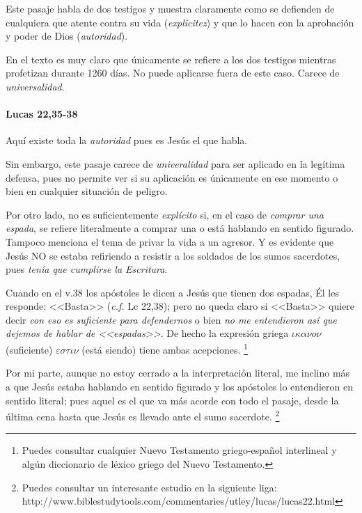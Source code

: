 \documentclass{article}
\begin{document}
Este pasaje habla de dos testigos y muestra claramente como se defienden de cualquiera que atente contra su vida (\emph{explicitez}) y que lo hacen con la aprobaci\'on y poder de Dios (\emph{autoridad}).

En el texto es muy claro que \'unicamente se refiere a los dos testigos mientras profetizan durante 1260 d\'{i}as. No puede aplicarse fuera de este caso. Carece de \emph{universalidad}.

\paragraph{Lucas 22,35-38}

Aqu\'{i} existe toda la \emph{autoridad} pues es Jes\'us el que habla.

Sin embargo, este pasaje carece de \emph{univeralidad} para ser aplicado en la leg\'{i}tima defensa, pues no permite ver si su aplicaci\'on es \'unicamente en ese momento o bien en cualquier situaci\'on de peligro.

Por otro lado, no es suficientemente \emph{expl\'{i}cito} si, en el caso de \emph{comprar una espada}, se refiere literalmente a comprar una o est\'a hablando en sentido figurado. Tampoco menciona el tema de privar la vida a un agresor. Y es evidente que Jes\'us NO se estaba refiriendo a resistir a los soldados de los sumos sacerdotes, pues \emph{ten\'{i}a que cumplirse la Escritura}.

Cuando en el v.38 los ap\'ostoles le dicen a Jes\'us que tienen dos espadas, \'El les responde: <<Basta>> (\emph{c.f.} Lc 22,38); pero no queda claro si <<Basta>> quiere decir \emph{con eso es suficiente para defendernos} o bien \emph{no me entendieron as\'{i} que dejemos de hablar de <<espadas>>}. De hecho la expresi\'on griega $\iota\kappa\alpha\nu o \nu$ (suficiente) $\varepsilon\sigma\tau\iota\nu$ (est\'a siendo) tiene ambas acepciones.%
    \footnote{Puedes consultar cualquier Nuevo Testamento griego-espa\~nol interlineal y alg\'un diccionario de l\'exico griego del Nuevo Testamento.}
    
Por mi parte, aunque no estoy cerrado a la interpretaci\'on literal, me inclino m\'as a que Jes\'us estaba hablando en sentido figurado y los ap\'ostoles lo entendieron en sentido literal; pues aquel es el que va m\'as acorde con todo el pasaje, desde la \'ultima cena hasta que Jes\'us es llevado ante el sumo sacerdote.%
    \footnote{Puedes consultar un interesante estudio en la siguiente liga: http://www.biblestudytools.com/commentaries/utley/lucas/lucas22.html}
\end{document}
